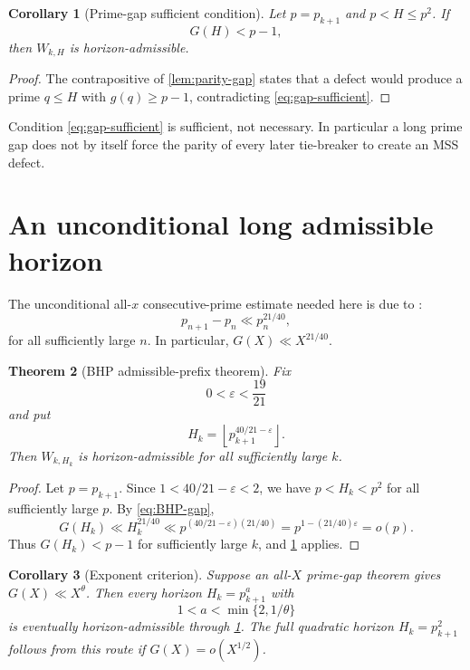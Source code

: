 \documentclass[11pt]{article}
\newtheorem{theorem}{Theorem}[section]
\newtheorem{corollary}[theorem]{Corollary}
\theoremstyle{definition}
\theoremstyle{remark}
\newcommand{\eps}{\varepsilon}
\begin{document}
\begin{corollary}[Prime-gap sufficient condition]\label{cor:gap-condition}
Let $p=p_{k+1}$ and $p<H\le p^2$.  If
\begin{equation}\label{eq:gap-sufficient}
    G(H)<p-1,
\end{equation}
then $W_{k,H}$ is horizon-admissible.
\end{corollary}

\begin{proof}
The contrapositive of \cref{lem:parity-gap} states that a defect would produce a prime $q\le H$ with $g(q)\ge p-1$, contradicting \eqref{eq:gap-sufficient}.
\end{proof}

Condition \eqref{eq:gap-sufficient} is sufficient, not necessary.  In particular a long prime gap does not by itself force the parity of every later tie-breaker to create an MSS defect.

\section{An unconditional long admissible horizon}

The unconditional all-$x$ consecutive-prime estimate needed here is due to \citet{BakerHarmanPintz2001}:
\begin{equation}\label{eq:BHP-gap}
    p_{n+1}-p_n\ll p_n^{21/40},
\end{equation}
for all sufficiently large $n$.  In particular, $G(X)\ll X^{21/40}$.

\begin{theorem}[BHP admissible-prefix theorem]\label{thm:BHP-horizon}
Fix
\[
    0<\eps<\frac{19}{21}
\]
and put
\begin{equation}\label{eq:Hk}
    H_k=\left\lfloor p_{k+1}^{40/21-\eps}\right\rfloor.
\end{equation}
Then $W_{k,H_k}$ is horizon-admissible for all sufficiently large $k$.
\end{theorem}

\begin{proof}
Let $p=p_{k+1}$.  Since $1<40/21-\eps<2$, we have $p<H_k<p^2$ for all sufficiently large $p$.  By \eqref{eq:BHP-gap},
\[
    G(H_k)
    \ll H_k^{21/40}
    \ll p^{(40/21-\eps)(21/40)}
    =p^{1-(21/40)\eps}
    =o(p).
\]
Thus $G(H_k)<p-1$ for sufficiently large $k$, and \cref{cor:gap-condition} applies.
\end{proof}

\begin{corollary}[Exponent criterion]\label{cor:exponent-criterion}
Suppose an all-$X$ prime-gap theorem gives $G(X)\ll X^\theta$.  Then every horizon $H_k=p_{k+1}^{a}$ with
\[
    1<a<\min\{2,1/\theta\}
\]
is eventually horizon-admissible through \cref{cor:gap-condition}.  The full quadratic horizon $H_k=p_{k+1}^2$ follows from this route if $G(X)=o(X^{1/2})$.
\end{corollary}
\end{document}

